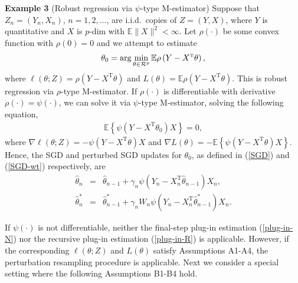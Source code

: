 \documentclass[twoside,11pt]{article}
\def\arg{\mathop{\rm arg}}
\def\trans{^{ \mathrm{\scriptscriptstyle T} }}
\def\wh{\widehat}
\begin{document}
{\bf Example 3} (Robust regression via $\psi$-type M-estimator) Suppose that $Z_n=(Y_n, X_n)$, $n=1, 2, \dots$, are i.i.d.~copies of $Z=(Y, X)$, where $Y$ is quantitative and $X$ is $p$-dim with $\mathbb{E}\|X\|^2<\infty$. Let $\rho(\cdot)$ be some convex function with $\rho(0)=0$ and we attempt to estimate
\begin{eqnarray}\label{eg-rr-rho}
\theta_0=\arg\min_{\theta\in\mathcal{R}^p}\mathbb{E}\rho\left(Y-X\trans\theta\right),
\end{eqnarray}
where $\ell(\theta; Z)=\rho(Y-X\trans\theta)$ and $L(\theta)=\mathbb{E}\rho\left(Y-X\trans\theta\right)$. This is robust regression via $\rho$-type M-estimator. If $\rho(\cdot)$ is differentiable with derivative $\dot{\rho}(\cdot)=\psi(\cdot)$, we can solve it via $\psi$-type M-estimator, solving the following equation,
\begin{eqnarray}\label{eg-rr-psi}
\mathbb{E}\left\{\psi\left(Y-X\trans\theta_0\right)X\right\}=0,
\end{eqnarray}
where $\nabla\ell(\theta; Z)=-\psi(Y-X\trans\theta)X$ and $\nabla L(\theta)=-\mathbb{E}\left\{\psi\left(Y-X\trans\theta\right)X\right\}$. Hence, the SGD and perturbed SGD updates for $\theta_0$, as defined in (\ref{SGD}) and (\ref{SGD-wt}) respectively, are
\begin{eqnarray}
\wh{\theta}_n&=&\wh{\theta}_{n-1}+\gamma_n\psi(Y_n-X_n\trans\wh{\theta}_{n-1})X_n,\label{SGD-M}\\
\wh{\theta}^*_n&=&\wh{\theta}^*_{n-1}+\gamma_nW_n\psi(Y_n-X_n\trans\wh{\theta}^*_{n-1})X_n.\label{SGD-M-wt}
\end{eqnarray}

If $\psi(\cdot)$ is not differentiable, neither the final-step plug-in estimation (\ref{plug-in-N}) nor the recursive plug-in estimation (\ref{plug-in-R}) is applicable. However, if the corresponding $\ell(\theta; Z)$ and $L(\theta)$ satisfy Assumptions A1-A4, the perturbation resampling procedure is applicable. Next we consider a special setting where the following Assumptions B1-B4 hold.
\end{document}
